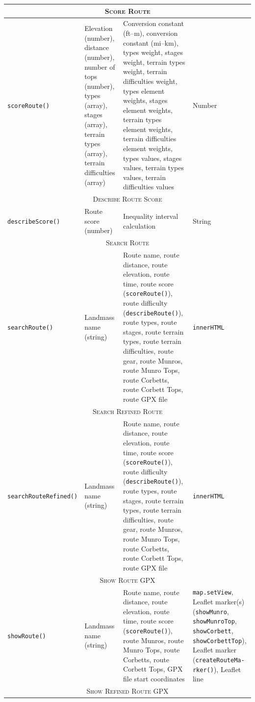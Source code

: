 \documentclass[11pt, english]{article}
\begin{document}
\begin{center}
\begin{longtable}{p{2.25cm}p{3.5cm}p{5cm}p{2cm}}
		\hline
		\multicolumn{4}{c}{\textsc{Score Route}}\\
		\hline
		\texttt{scoreRoute()} & Elevation (number), distance (number), number of tops (number), types (array), stages (array), terrain types (array), terrain difficulties (array) & Conversion constant (ft--m), conversion constant (mi--km), types weight, stages weight, terrain types weight, terrain difficulties weight, types element weights, stages element weights, terrain types element weights, terrain difficulties element weights, types values, stages values, terrain types values, terrain difficulties values & Number\\
		\hline
		\multicolumn{4}{c}{\textsc{Describe Route Score}}\\
		\hline
		\texttt{describeScore()} & Route score (number) & Inequality interval calculation & String\\
		\hline
		\multicolumn{4}{c}{\textsc{Search Route}}\\
		\hline
		\texttt{searchRoute()} & Landmass name (string) & Route name, route distance, route elevation, route time, route score (\texttt{scoreRoute()}), route difficulty (\texttt{describeRoute()}), route types, route stages, route terrain types, route terrain difficulties, route gear, route Munros, route Munro Tops, route Corbetts, route Corbett Tops, route GPX file & \texttt{innerHTML}\\
		\hline
		\multicolumn{4}{c}{\textsc{Search Refined Route}}\\
		\hline
		\texttt{searchRouteRefined()} & Landmass name (string) & Route name, route distance, route elevation, route time, route score (\texttt{scoreRoute()}), route difficulty (\texttt{describeRoute()}), route types, route stages, route terrain types, route terrain difficulties, route gear, route Munros, route Munro Tops, route Corbetts, route Corbett Tops, route GPX file & \texttt{innerHTML}\\
		\hline
		\multicolumn{4}{c}{\textsc{Show Route GPX}}\\
		\hline
		\texttt{showRoute()} & Landmass name (string) & Route name, route distance, route elevation, route time, route score (\texttt{scoreRoute()}), route Munros, route Munro Tops, route Corbetts, route Corbett Tops, GPX file start coordinates & \texttt{map.setView}, Leaflet marker(s) (\texttt{showMunro}, \texttt{showMunroTop}, \texttt{showCorbett}, \texttt{showCorbettTop}), Leaflet marker (\texttt{createRouteMa- rker()}), Leaflet line\\
		\hline
		\multicolumn{4}{c}{\textsc{Show Refined Route GPX}}\\

\end{longtable}
\end{center}
\end{document}

